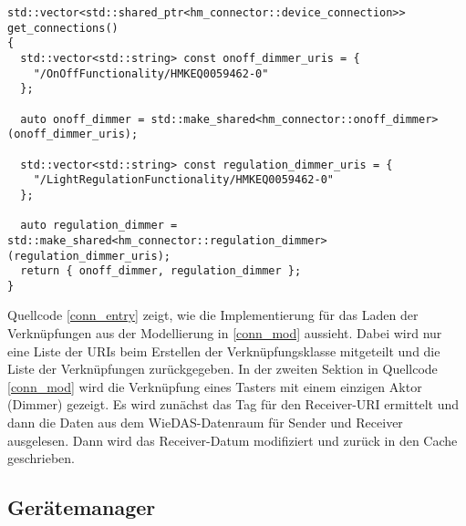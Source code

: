 \lstset{language=C++}
\begin{lstlisting}[frame=single,caption={Implementierung der Eintrittsfunktion eines Verknüpfungstyps},label=conn_entry]
std::vector<std::shared_ptr<hm_connector::device_connection>> get_connections()
{
  std::vector<std::string> const onoff_dimmer_uris = {
    "/OnOffFunctionality/HMKEQ0059462-0"
  };

  auto onoff_dimmer = std::make_shared<hm_connector::onoff_dimmer>(onoff_dimmer_uris);

  std::vector<std::string> const regulation_dimmer_uris = {
    "/LightRegulationFunctionality/HMKEQ0059462-0"
  };

  auto regulation_dimmer = std::make_shared<hm_connector::regulation_dimmer>(regulation_dimmer_uris);
  return { onoff_dimmer, regulation_dimmer };
}
\end{lstlisting}


Quellcode \ref{conn_entry} zeigt, wie die Implementierung für das Laden der Verknüpfungen aus der Modellierung
in \ref{conn_mod} aussieht.
Dabei wird nur eine Liste der URIs beim Erstellen der Verknüpfungsklasse mitgeteilt und die Liste
der Verknüpfungen zurückgegeben.
In der zweiten Sektion in Quellcode \ref{conn_mod} wird die Verknüpfung eines Tasters mit einem einzigen Aktor (Dimmer)
gezeigt.
Es wird zunächst das Tag für den Receiver-URI ermittelt und dann die Daten aus dem WieDAS-Datenraum für Sender
und Receiver ausgelesen.
Dann wird das Receiver-Datum modifiziert und zurück in den Cache geschrieben.

\subsection{Gerätemanager}
\label{imp_abb_gemenge}

